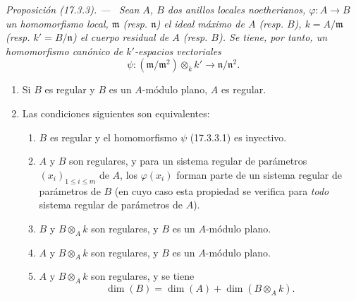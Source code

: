 \documentclass[10pt,oneside]{book}
\makeatletter
\newcommand{\setmanualcurrentlabel}[1]{\def\@currentlabel{#1}}
\newenvironment{proposition}[1][]{%
  \setmanualcurrentlabel{#1}\par\medskip\noindent\itshape Proposición (#1). ---\ }{\par}
\makeatother
\begin{document}
\begin{proposition}[17.3.3]
\label{0.17.3.3-es}
Sean $A$, $B$ dos anillos locales noetherianos,
$\varphi:A\longrightarrow B$ un homomorfismo local, $\mathfrak{m}$ \textup{(resp.
$\mathfrak n$)} el ideal máximo de $A$ \textup{(resp. $B$)},
$k=A/\mathfrak{m}$ \textup{(resp. $k'=B/\mathfrak{n}$)} el cuerpo residual de $A$
\textup{(resp. $B$)}. Se tiene, por tanto, un homomorfismo canónico de $k'$-espacios
vectoriales
\begin{equation}
\label{0.17.3.3.1-es}
\tag{17.3.3.1}
  \psi:(\mathfrak{m}/\mathfrak{m}^2)\otimes_k k'
  \longrightarrow\mathfrak{n}/\mathfrak{n}^2.
\end{equation}
\begin{enumerate}
  \item[\rm (i)] Si $B$ es regular y $B$ es un $A$-módulo plano, $A$ es
  regular.
  \item[\rm (ii)] Las condiciones siguientes son equivalentes:
  \begin{enumerate}
    \item[\textit{a)}] $B$ es regular y el homomorfismo $\psi$ \textup{(17.3.3.1)} es
    inyectivo.
    \item[\textit{b)}] $A$ y $B$ son regulares, y para un sistema regular de
    parámetros $(x_i)_{1\leq i\leq m}$ de $A$, los $\varphi(x_i)$ forman parte
    de un sistema regular de parámetros de $B$ \textup{(en cuyo caso esta propiedad se
    verifica para \emph{todo} sistema regular de parámetros de $A$)}.
    \item[\textit{c)}] $B$ y $B\otimes_A k$ son regulares, y $B$ es un $A$-módulo
    plano.
    \item[\textit{d)}] $A$ y $B\otimes_A k$ son regulares, y $B$ es un $A$-módulo
    plano.
    \item[\textit{e)}] $A$ y $B\otimes_A k$ son regulares, y se tiene
    \begin{equation}
    \label{0.17.3.3.2-es}
    \tag{17.3.3.2}
      \dim(B)=\dim(A)+\dim(B\otimes_A k).
    \end{equation}
  \end{enumerate}
\end{enumerate}
\end{proposition}
\end{document}
